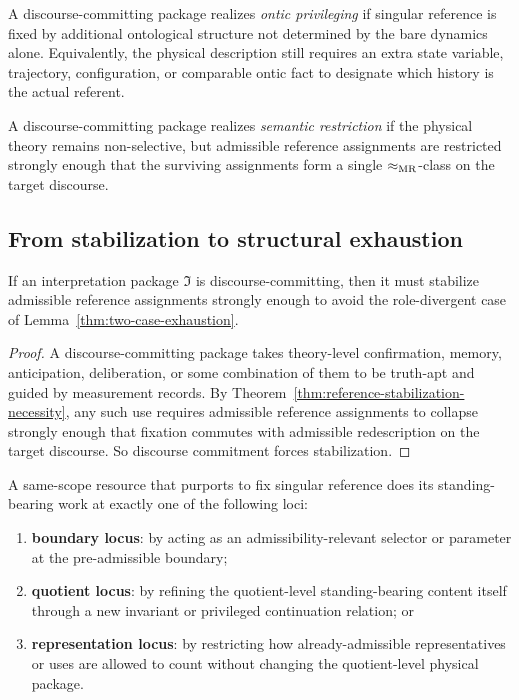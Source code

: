 \begin{definition}
A discourse-committing package realizes \emph{ontic privileging} if singular reference is fixed by
additional ontological structure not determined by the bare dynamics alone. Equivalently, the
physical description still requires an extra state variable, trajectory, configuration, or comparable
ontic fact to designate which history is the actual referent.
\end{definition}

\begin{definition}
A discourse-committing package realizes \emph{semantic restriction} if the physical theory remains
non-selective, but admissible reference assignments are restricted strongly enough that the surviving
assignments form a single $\mathrel{\approx_{\mathrm{MR}}}$-class on the target discourse.
\end{definition}

\subsection{From stabilization to structural exhaustion}

\begin{lemma}
\label{lem:discourse-commitment-stabilization}
If an interpretation package $\mathfrak{I}$ is discourse-committing, then it must stabilize admissible
reference assignments strongly enough to avoid the role-divergent case of
Lemma~\ref{thm:two-case-exhaustion}.
\end{lemma}

\begin{proof}
A discourse-committing package takes theory-level confirmation, memory, anticipation, deliberation,
or some combination of them to be truth-apt and guided by measurement records. By
Theorem~\ref{thm:reference-stabilization-necessity}, any such use requires admissible reference
assignments to collapse strongly enough that fixation commutes with admissible redescription on the
target discourse. So discourse commitment forces stabilization.
\end{proof}

\begin{definition}
\label{def:selector-locus}
A same-scope resource that purports to fix singular reference does its standing-bearing work at
exactly one of the following loci:
\begin{enumerate}
    \item \textbf{boundary locus}: by acting as an admissibility-relevant selector or parameter at the
    pre-admissible boundary;
    \item \textbf{quotient locus}: by refining the quotient-level standing-bearing content itself through a
    new invariant or privileged continuation relation; or
    \item \textbf{representation locus}: by restricting how already-admissible representatives or uses are
    allowed to count without changing the quotient-level physical package.
\end{enumerate}
\end{definition}

